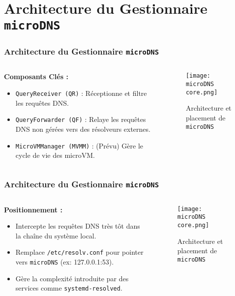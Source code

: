 \documentclass[12pt]{beamer}
\begin{document}
    \section{Architecture du Gestionnaire \texttt{microDNS}}
	\begin{frame}
		\frametitle{Architecture du Gestionnaire \texttt{microDNS}}
		\begin{columns}[T] %
			\begin{column}{0.5\textwidth}
				\RaggedRight %
				\textbf{Composants Clés :}
				\begin{itemize}
					\item \texttt{QueryReceiver (QR)} : Réceptionne et filtre les requêtes DNS.
					\item \texttt{QueryForwarder (QF)} : Relaye les requêtes DNS non gérées vers des résolveurs externes.
					\item \texttt{MicroVMManager (MVMM)} : (Prévu) Gère le cycle de vie des microVM.
				\end{itemize}
			\end{column}
			\begin{column}{0.5\textwidth}
				\begin{figure}
					\texttt{[image: microDNS core.png]}
					\caption{Architecture et placement de \texttt{microDNS}}
				\end{figure}
			\end{column}
		\end{columns}
	\end{frame}

	\begin{frame}
		\frametitle{Architecture du Gestionnaire \texttt{microDNS}}
		\begin{columns}[T] %
			\begin{column}{0.5\textwidth}
				\RaggedRight %
				\textbf{Positionnement :}
				\begin{itemize}
					\item Intercepte les requêtes DNS très tôt dans la chaîne du système local.
					\item Remplace \texttt{/etc/resolv.conf} pour pointer vers \texttt{microDNS} (ex: 127.0.0.1:53).
					\item Gère la complexité introduite par des services comme \texttt{systemd-resolved}.
				\end{itemize}
			\end{column}
			\begin{column}{0.5\textwidth}
				\begin{figure}
					\texttt{[image: microDNS core.png]}
					\caption{Architecture et placement de \texttt{microDNS}}
				\end{figure}
			\end{column}
		\end{columns}
	\end{frame}
\end{document}
